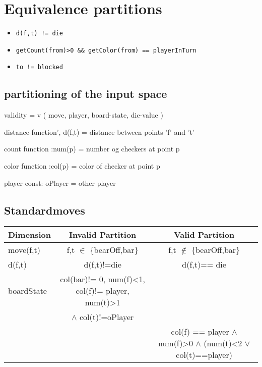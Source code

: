 \documentclass[a4paper]{article}
\begin{document}
\lhead{}
\rhead{}

\section{Equivalence partitions}

\begin{itemize}
\item
\begin{verbatim}
d(f,t) != die
\end{verbatim}


\item
\begin{verbatim}
getCount(from)>0 && getColor(from) == playerInTurn
\end{verbatim}


\item
\begin{verbatim}
to != blocked
\end{verbatim}

\end{itemize}

\subsection{partitioning of the input space}
validity = v ( move, player, board-state, die-value ) 

distance-function', d(f,t) = distance between points 'f' and 't'

count function :num(p) = number og checkers at point p

color function :col(p) = color of checker at point p

player const: oPlayer = other player 

\subsection{Standardmoves}

\noindent
\begin{tabular}{l|c|c}
Dimension & Invalid Partition & Valid Partition \\
\hline
move(f,t) & f,t $\in$ \{bearOff,bar\}   &  f,t $\notin$ \{bearOff,bar\}  \\
d(f,t) & d(f,t)!=die & d(f,t)== die \\

boardState &  col(bar)!= 0, num(f)<1, col(f)!= player, num(t)>1 &  \\
 & $\wedge$ col(t)!=oPlayer  &  \\
 & & col(f) == player $\wedge$ num(f)>0 $\wedge$
(num(t)<2 $\vee$ col(t)==player) 

\end{tabular}
\end{document}
